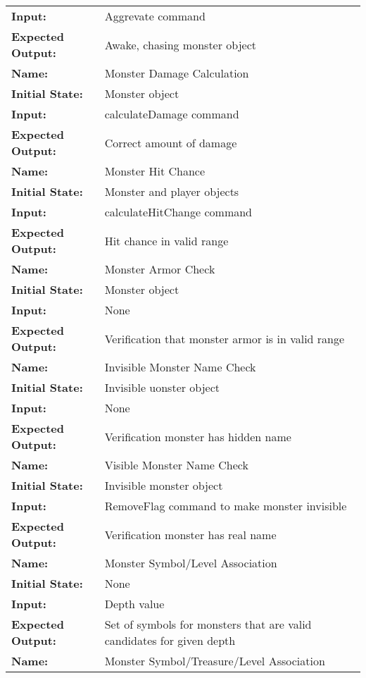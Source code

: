 \documentclass[12pt, titlepage]{article}
\begin{document}
\begin{center}
\begin{longtable}{ l | p{10cm} }
				\textbf{Input:} & Aggrevate command\\
				\textbf{Expected Output:} & Awake, chasing monster object\\
				\hline
				\textbf{Name:} & Monster Damage Calculation\\
				\textbf{Initial State:} & Monster object\\
				\textbf{Input:} & calculateDamage command\\
				\textbf{Expected Output:} & Correct amount of damage\\
				\hline
				\textbf{Name:} & Monster Hit Chance\\
				\textbf{Initial State:} & Monster and player objects\\
				\textbf{Input:} & calculateHitChange command\\
				\textbf{Expected Output:} & Hit chance in valid range\\
				\hline
				\textbf{Name:} & Monster Armor Check\\
				\textbf{Initial State:} & Monster object\\
				\textbf{Input:} & None\\
				\textbf{Expected Output:} & Verification that monster armor is in valid range\\
				\hline
				\textbf{Name:} & Invisible Monster Name Check\\
				\textbf{Initial State:} & Invisible uonster object\\
				\textbf{Input:} & None\\
				\textbf{Expected Output:} & Verification monster has hidden name\\
				\hline
				\textbf{Name:} & Visible Monster Name Check\\
				\textbf{Initial State:} & Invisible monster object\\
				\textbf{Input:} & RemoveFlag command to make monster invisible\\
				\textbf{Expected Output:} & Verification monster has real name\\
				\hline
				\textbf{Name:} & Monster Symbol/Level Association\\
				\textbf{Initial State:} & None\\
				\textbf{Input:} & Depth value\\
				\textbf{Expected Output:} & Set of symbols for monsters that are valid candidates for given depth\\
				\hline
				\textbf{Name:} & Monster Symbol/Treasure/Level Association\\

\end{longtable}
\end{center}
\end{document}
